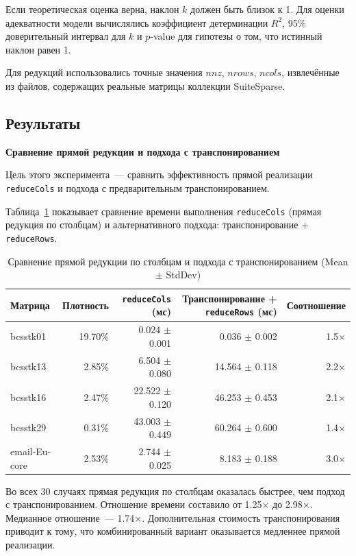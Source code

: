 \documentclass[a4paper]{article}
\begin{document}
Если теоретическая оценка верна, наклон \(k\) должен быть близок к 1. Для оценки адекватности модели вычислялись коэффициент детерминации \(R^2\), 95\% доверительный интервал для \(k\) и \(p\)-value для гипотезы о том, что истинный наклон равен 1.

Для редукций использовались точные значения \(nnz\), \(nrows\), \(ncols\), извлечённые из файлов, содержащих реальные матрицы коллекции SuiteSparse.

\subsection{Результаты}

\textbf{Сравнение прямой редукции и подхода с транспонированием}

Цель этого эксперимента~--- сравнить эффективность прямой реализации \texttt{reduceCols} и подхода с предварительным транспонированием.

Таблица~\ref{tab:reduce_comparison} показывает сравнение времени выполнения \texttt{reduceCols} (прямая редукция по столбцам) и альтернативного подхода: транспонирование + \texttt{reduceRows}.

\begin{table}[H]
\centering
\caption{Сравнение прямой редукции по столбцам и подхода с транспонированием (Mean $\pm$ StdDev)}
\label{tab:reduce_comparison}
\begin{tabular}{lrrrr}
\toprule
Матрица & Плотность & \texttt{reduceCols} (мс) & Транспонирование + \texttt{reduceRows} (мс) & Соотношение \\
\midrule
bcsstk01 & 19.70\% & 0.024 $\pm$ 0.001 & 0.036 $\pm$ 0.002 & 1.5$\times$ \\
bcsstk13 & 2.85\% & 6.504 $\pm$ 0.080 & 14.564 $\pm$ 0.118 & 2.2$\times$ \\
bcsstk16 & 2.47\% & 22.522 $\pm$ 0.120 & 46.253 $\pm$ 0.453 & 2.1$\times$ \\
bcsstk29 & 0.31\% & 43.003 $\pm$ 0.449 & 60.264 $\pm$ 0.600 & 1.4$\times$ \\
email-Eu-core & 2.53\% & 2.744 $\pm$ 0.025 & 8.183 $\pm$ 0.188 & 3.0$\times$ \\
\bottomrule
\end{tabular}
\end{table}

Во всех 30 случаях прямая редукция по столбцам оказалась быстрее, чем подход с транспонированием. Отношение времени составило от 1.25$\times$ до 2.98$\times$. Медианное отношение~--- 1.74$\times$. Дополнительная стоимость транспонирования приводит к тому, что комбинированный вариант оказывается медленнее прямой реализации.
\end{document}
